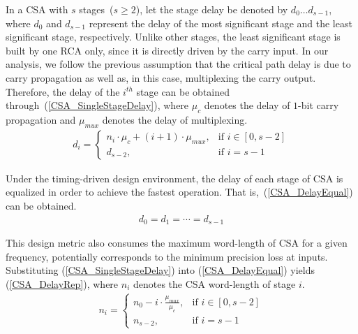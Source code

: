 \documentclass[journal]{IEEEtran}
\begin{document}
In a CSA with $s$ stages~($s\geqslant 2$), let the stage delay be denoted by $d_{0}\dots d_{s-1}$, where $d_{0}$ and $d_{s-1}$ represent the delay of the most significant stage and the least significant stage, respectively. Unlike other stages, the least significant stage is built by one RCA only, since it is directly driven by the carry input. In our analysis, we follow the previous assumption that the critical path delay is due to carry propagation as well as, in this case, multiplexing the carry output. Therefore, the delay of the $i^{th}$ stage can be obtained through~(\ref{CSA_SingleStageDelay}), where $\mu_{c}$ denotes the delay of $1$-bit carry propagation and $\mu_{mux}$ denotes the delay of multiplexing.
\begin{eqnarray}\label{CSA_SingleStageDelay}
  d_i=\left\{
    \begin{matrix}
      n_i\cdot \mu_{c}+(i+1)\cdot\mu_{mux}, &\textrm{if $i\in\left[0,s-2\right]$}\\
      d_{s-2}, & \textrm{if $i=s-1$}
    \end{matrix}
  \right.
\end{eqnarray}

Under the timing-driven design environment, the delay of each stage of CSA is equalized in order to achieve the fastest operation. That is,~(\ref{CSA_DelayEqual}) can be obtained.
\begin{eqnarray}\label{CSA_DelayEqual}
  d_0=d_1=\cdots=d_{s-1}
\end{eqnarray}

This design metric also consumes the maximum word-length of CSA for a given frequency, potentially corresponds to the minimum precision loss at inputs. Substituting (\ref{CSA_SingleStageDelay}) into (\ref{CSA_DelayEqual}) yields (\ref{CSA_DelayRep}), where $n_i$ denotes the CSA word-length of stage $i$.
\begin{eqnarray}\label{CSA_DelayRep}
 n_i=\left\{
	\begin{matrix}
	  n_0-i\cdot\frac{\mu_{mux}}{\mu_c}, & \textrm{if $i\in\left[0,s-2\right]$}\\
	  n_{s-2}, &\textrm{if $i=s-1$}
	\end{matrix}
    \right.
\end{eqnarray}
\end{document}
